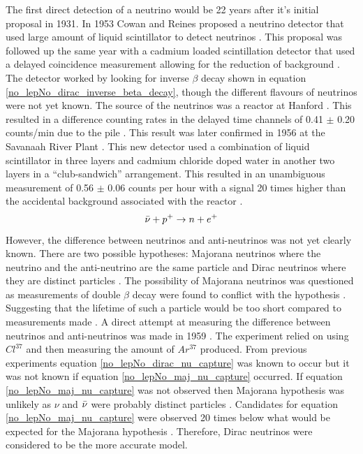 \documentclass[12pt,a4paper]{article}
\begin{document}
The first direct detection of a neutrino would be 22 years after it's initial proposal in 1931. In 1953 Cowan and Reines proposed a neutrino detector that used large amount of liquid scintillator to detect neutrinos \cite{reines1953proposed}. This proposal was followed up the same year with a cadmium loaded scintillation detector that used a delayed coincidence measurement allowing for the reduction of background \cite{reines1953proposed} \cite{reines1953detection}. The detector worked by looking for inverse $\beta$ decay shown in equation \ref{no_lepNo_dirac_inverse_beta_decay}, though the different flavours of neutrinos were not yet known. The source of the neutrinos was a reactor at Hanford \cite{reines1953detection}. This resulted in a difference counting rates in the delayed time channels of 0.41 $\pm$ 0.20 counts/min due to the pile \cite{reines1953detection}. This result was later confirmed in 1956 at the Savanaah River Plant \cite{Cowan1956Confirmation}. This new detector used a combination of liquid scintillator in three layers and cadmium chloride doped water in another two layers in a ``club-sandwich'' arrangement. This resulted in an unambiguous measurement of 0.56 $\pm$ 0.06 counts per hour with a signal 20 times higher than the accidental background associated with the reactor \cite{Cowan1956Confirmation}. 
\begin{equation}
    \Bar{\nu} + p^+ \rightarrow n + e^+
    \label{no_lepNo_dirac_inverse_beta_decay}
\end{equation}
However, the difference between neutrinos and anti-neutrinos was not yet clearly known. There are two possible hypotheses: Majorana neutrinos where the neutrino and the anti-neutrino are the same particle and Dirac neutrinos where they are distinct particles \cite{griffiths2008book} \cite{griffiths2008neutrino1.5} \cite{cowan1957test}. The possibility of Majorana neutrinos was questioned as measurements of double $\beta$ decay were found to conflict with the hypothesis \cite{cowan1957test}. Suggesting that the lifetime of such a particle would be too short compared to measurements made \cite{cowan1957test}. A direct attempt at measuring the difference between neutrinos and anti-neutrinos was made in 1959 \cite{davis1959attempt}. The experiment relied on using $Cl^{37}$ and then measuring the amount of $Ar^{37}$ produced. From previous experiments \cite{Cowan1956Confirmation} equation \ref{no_lepNo_dirac_nu_capture} was known to occur but it was not known if equation \ref{no_lepNo_maj_nu_capture} occurred. If equation \ref{no_lepNo_maj_nu_capture} was not observed then Majorana hypothesis was unlikely as $\nu$ and $\Bar{\nu}$ were probably distinct particles \cite{griffiths2008book} \cite{griffiths2008neutrino1.5} \cite{davis1959attempt}. Candidates for equation \ref{no_lepNo_maj_nu_capture} were observed 20 times below what would be expected for the Majorana hypothesis \cite{davis1959attempt}. Therefore, Dirac neutrinos were considered to be the more accurate model. 
\end{document}
